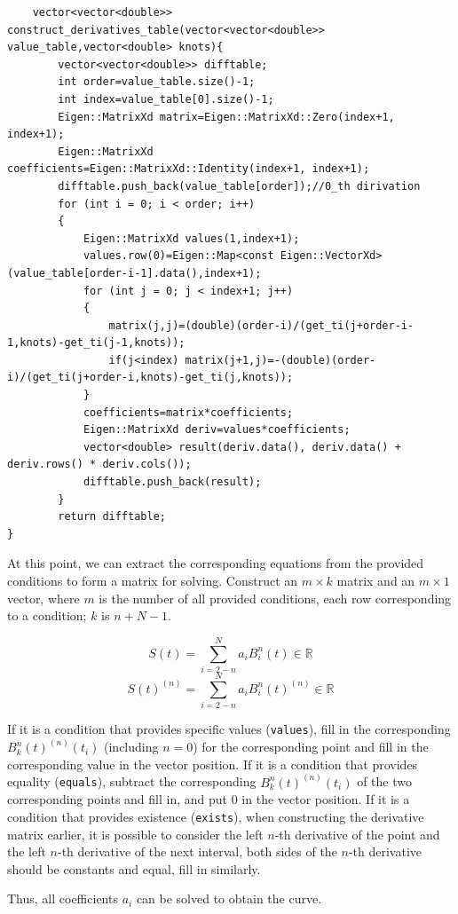 \documentclass[a4paper]{article}
\begin{document}
\begin{verbatim}
    vector<vector<double>> construct_derivatives_table(vector<vector<double>> value_table,vector<double> knots){
        vector<vector<double>> difftable;
        int order=value_table.size()-1;
        int index=value_table[0].size()-1;
        Eigen::MatrixXd matrix=Eigen::MatrixXd::Zero(index+1, index+1);
        Eigen::MatrixXd coefficients=Eigen::MatrixXd::Identity(index+1, index+1);     
        difftable.push_back(value_table[order]);//0_th dirivation
        for (int i = 0; i < order; i++)
        {
            Eigen::MatrixXd values(1,index+1);
            values.row(0)=Eigen::Map<const Eigen::VectorXd>(value_table[order-i-1].data(),index+1);
            for (int j = 0; j < index+1; j++)
            {
                matrix(j,j)=(double)(order-i)/(get_ti(j+order-i-1,knots)-get_ti(j-1,knots));
                if(j<index) matrix(j+1,j)=-(double)(order-i)/(get_ti(j+order-i,knots)-get_ti(j,knots));
            }
            coefficients=matrix*coefficients;
            Eigen::MatrixXd deriv=values*coefficients;
            vector<double> result(deriv.data(), deriv.data() + deriv.rows() * deriv.cols());
            difftable.push_back(result);
        }
        return difftable;
}
\end{verbatim}
At this point, we can extract the corresponding equations from the provided conditions to form a matrix for solving. Construct an $m \times k$ matrix and an $m \times 1$ vector, where $m$ is the number of all provided conditions, each row corresponding to a condition; $k$ is $n + N - 1$.

\[
S(t) = \sum_{i=2-n}^{N} a_i B_i^n(t) \in \mathbb{R}
\]
\[
S(t)^{(n)} = \sum_{i=2-n}^{N} a_i B_i^n(t)^{(n)} \in \mathbb{R}
\]

If it is a condition that provides specific values (\texttt{values}), fill in the corresponding $B_k^n(t)^{(n)}(t_i)$ (including $n=0$) for the corresponding point and fill in the corresponding value in the vector position. If it is a condition that provides equality (\texttt{equals}), subtract the corresponding $B_k^n(t)^{(n)}(t_i)$ of the two corresponding points and fill in, and put 0 in the vector position. If it is a condition that provides existence (\texttt{exists}), when constructing the derivative matrix earlier, it is possible to consider the left $n$-th derivative of the point and the left $n$-th derivative of the next interval, both sides of the $n$-th derivative should be constants and equal, fill in similarly.

Thus, all coefficients $a_i$ can be solved to obtain the curve.
\end{document}
